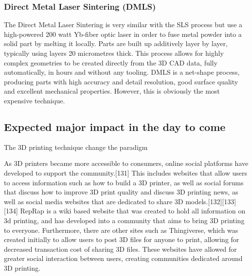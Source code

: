 \subsubsection{Direct Metal Laser Sintering (DMLS)} %

The Direct Metal Laser Sintering is very similar with the SLS process but use a high-powered 200 watt Yb-fiber optic laser in order to fuse metal powder into a solid part by melting it locally. Parts are built up additively layer by layer, typically using layers 20 micrometres thick. This process allows for highly complex geometries to be created directly from the 3D CAD data, fully automatically, in hours and without any tooling. DMLS is a net-shape process, producing parts with high accuracy and detail resolution, good surface quality and excellent mechanical properties. However, this is obviously the most expensive technique.

\begin{figure}[h]
    \centering
        \hfil
        \hfil
    \caption{}
    \label{fig:DMLS_technique}
\end{figure}


\subsection{Expected major impact in the day to come} %

The 3D printing technique change the paradigm

As 3D printers became more accessible to consumers, online social platforms have developed to support the community.[131] This includes websites that allow users to access information such as how to build a 3D printer, as well as social forums that discuss how to improve 3D print quality and discuss 3D printing news, as well as social media websites that are dedicated to share 3D models.[132][133][134]
RepRap is a wiki based website that was created to hold all information on 3d printing, and has developed into a community that aims to bring 3D printing to everyone. Furthermore, there are other sites such as Thingiverse, which was created initially to allow users to post 3D files for anyone to print, allowing for decreased transaction cost of sharing 3D files. These websites have allowed for greater social interaction between users, creating communities dedicated around 3D printing.

